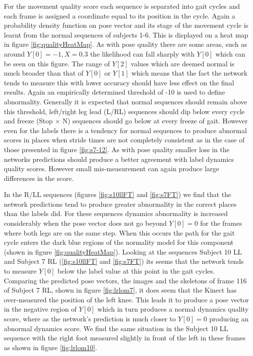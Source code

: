 \documentclass[11pt]{article} %
\begin{document}
For the movement quality score each sequence is separated into gait cycles and each frame is assigned a coordinate equal to its position in the cycle. Again a probability density function on pose vector and its stage of the movement cycle is learnt from the normal sequences of subjects 1-6. This is displayed on a heat map in figure \ref{fig:qualityHeatMap}. As with pose quality there are some areas, such as around $Y[0]=-1,X=0.3$ the likelihood can fall sharply with $Y[0]$ which can be seen on this figure. The range of $Y[2]$ values which are deemed normal is much broader than that of $Y[0]$ or $Y[1]$ which means that the fact the network tends to measure this with lower accuracy should have less effect on the final results. Again an empirically determined threshold of -10 is used to define abnormality. Generally it is expected that normal sequences should remain above this threshold, left/right leg lead (L/RL) sequences should dip below every cycle and freeze (Stop $\times$ N) sequences should go below at every freeze of gait. However even for the labels there is a tendency for normal sequences to produce abnormal scores in places when stride times are not completely consistent as in the case of those presented in figure \ref{fig:s7-12}. As with pose quality smaller loss in the networks predictions should produce a better agreement with label dynamics quality scores. However small mis-measurement can again produce large differences in the score. 

In the R/LL sequences (figures \ref{fig:s10llFT} and \ref{fig:s7FT}) we find that the network predictions tend to produce greater abnormality in the correct places than the labels did. For these sequences dynamics abnormality is increased considerably when the pose vector does not go beyond $Y[0]=0$ for the frames where both legs are on the same step. When this occurs the path for the gait cycle enters the dark blue regions of the normality model for this component (shown in figure \ref{fig:qualityHeatMap}). Looking at the sequences Subject 10 LL and Subject 7 RL (\ref{fig:s10llFT} and \ref{fig:s7FT}) its seems that the network tends to measure $Y[0]$ below the label value at this point in the gait cycles. Comparing the predicted pose vectors, the images and the skeletons of frame 116 of Subject 7 RL, shown in figure \ref{fig:lrlom7}, it does seem that the Kinect has over-measured the position of the left knee. This leads it to produce a pose vector in the negative region of $Y[0]$ which in turn produces a normal dynamics quality score, where as the network's prediction is much closer to $Y[0]=0$ producing an abnormal dynamics score. We find the same situation in the Subject 10 LL sequence with the right foot measured slightly in front of the left in these frames as shown in figure \ref{fig:lrlom10}. 
\end{document}
